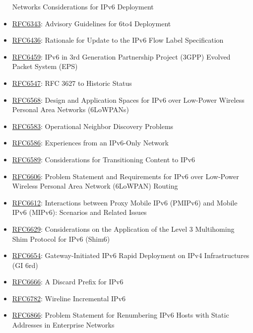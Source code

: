 \documentclass[
]{article}
\begin{document}
\begin{itemize}
  Networks Considerations for IPv6 Deployment
\item
  \href{https://www.rfc-editor.org/info/rfc6343}{RFC6343}: Advisory
  Guidelines for 6to4 Deployment
\item
  \href{https://www.rfc-editor.org/info/rfc6436}{RFC6436}: Rationale for
  Update to the IPv6 Flow Label Specification
\item
  \href{https://www.rfc-editor.org/info/rfc6459}{RFC6459}: IPv6 in 3rd
  Generation Partnership Project (3GPP) Evolved Packet System (EPS)
\item
  \href{https://www.rfc-editor.org/info/rfc6547}{RFC6547}: RFC 3627 to
  Historic Status
\item
  \href{https://www.rfc-editor.org/info/rfc6568}{RFC6568}: Design and
  Application Spaces for IPv6 over Low-Power Wireless Personal Area
  Networks (6LoWPANs)
\item
  \href{https://www.rfc-editor.org/info/rfc6583}{RFC6583}: Operational
  Neighbor Discovery Problems
\item
  \href{https://www.rfc-editor.org/info/rfc6586}{RFC6586}: Experiences
  from an IPv6-Only Network
\item
  \href{https://www.rfc-editor.org/info/rfc6589}{RFC6589}:
  Considerations for Transitioning Content to IPv6
\item
  \href{https://www.rfc-editor.org/info/rfc6606}{RFC6606}: Problem
  Statement and Requirements for IPv6 over Low-Power Wireless Personal
  Area Network (6LoWPAN) Routing
\item
  \href{https://www.rfc-editor.org/info/rfc6612}{RFC6612}: Interactions
  between Proxy Mobile IPv6 (PMIPv6) and Mobile IPv6 (MIPv6): Scenarios
  and Related Issues
\item
  \href{https://www.rfc-editor.org/info/rfc6629}{RFC6629}:
  Considerations on the Application of the Level 3 Multihoming Shim
  Protocol for IPv6 (Shim6)
\item
  \href{https://www.rfc-editor.org/info/rfc6654}{RFC6654}:
  Gateway-Initiated IPv6 Rapid Deployment on IPv4 Infrastructures (GI
  6rd)
\item
  \href{https://www.rfc-editor.org/info/rfc6666}{RFC6666}: A Discard
  Prefix for IPv6
\item
  \href{https://www.rfc-editor.org/info/rfc6782}{RFC6782}: Wireline
  Incremental IPv6
\item
  \href{https://www.rfc-editor.org/info/rfc6866}{RFC6866}: Problem
  Statement for Renumbering IPv6 Hosts with Static Addresses in
  Enterprise Networks

\end{itemize}
\end{document}
